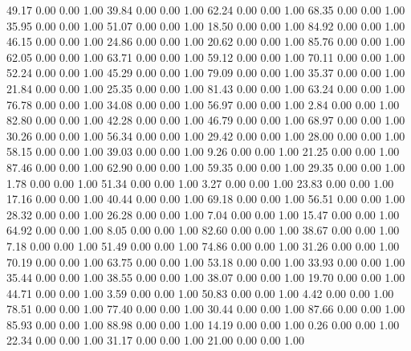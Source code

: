    49.17   0.00   0.00   1.00
   39.84   0.00   0.00   1.00
   62.24   0.00   0.00   1.00
   68.35   0.00   0.00   1.00
   35.95   0.00   0.00   1.00
   51.07   0.00   0.00   1.00
   18.50   0.00   0.00   1.00
   84.92   0.00   0.00   1.00
   46.15   0.00   0.00   1.00
   24.86   0.00   0.00   1.00
   20.62   0.00   0.00   1.00
   85.76   0.00   0.00   1.00
   62.05   0.00   0.00   1.00
   63.71   0.00   0.00   1.00
   59.12   0.00   0.00   1.00
   70.11   0.00   0.00   1.00
   52.24   0.00   0.00   1.00
   45.29   0.00   0.00   1.00
   79.09   0.00   0.00   1.00
   35.37   0.00   0.00   1.00
   21.84   0.00   0.00   1.00
   25.35   0.00   0.00   1.00
   81.43   0.00   0.00   1.00
   63.24   0.00   0.00   1.00
   76.78   0.00   0.00   1.00
   34.08   0.00   0.00   1.00
   56.97   0.00   0.00   1.00
    2.84   0.00   0.00   1.00
   82.80   0.00   0.00   1.00
   42.28   0.00   0.00   1.00
   46.79   0.00   0.00   1.00
   68.97   0.00   0.00   1.00
   30.26   0.00   0.00   1.00
   56.34   0.00   0.00   1.00
   29.42   0.00   0.00   1.00
   28.00   0.00   0.00   1.00
   58.15   0.00   0.00   1.00
   39.03   0.00   0.00   1.00
    9.26   0.00   0.00   1.00
   21.25   0.00   0.00   1.00
   87.46   0.00   0.00   1.00
   62.90   0.00   0.00   1.00
   59.35   0.00   0.00   1.00
   29.35   0.00   0.00   1.00
    1.78   0.00   0.00   1.00
   51.34   0.00   0.00   1.00
    3.27   0.00   0.00   1.00
   23.83   0.00   0.00   1.00
   17.16   0.00   0.00   1.00
   40.44   0.00   0.00   1.00
   69.18   0.00   0.00   1.00
   56.51   0.00   0.00   1.00
   28.32   0.00   0.00   1.00
   26.28   0.00   0.00   1.00
    7.04   0.00   0.00   1.00
   15.47   0.00   0.00   1.00
   64.92   0.00   0.00   1.00
    8.05   0.00   0.00   1.00
   82.60   0.00   0.00   1.00
   38.67   0.00   0.00   1.00
    7.18   0.00   0.00   1.00
   51.49   0.00   0.00   1.00
   74.86   0.00   0.00   1.00
   31.26   0.00   0.00   1.00
   70.19   0.00   0.00   1.00
   63.75   0.00   0.00   1.00
   53.18   0.00   0.00   1.00
   33.93   0.00   0.00   1.00
   35.44   0.00   0.00   1.00
   38.55   0.00   0.00   1.00
   38.07   0.00   0.00   1.00
   19.70   0.00   0.00   1.00
   44.71   0.00   0.00   1.00
    3.59   0.00   0.00   1.00
   50.83   0.00   0.00   1.00
    4.42   0.00   0.00   1.00
   78.51   0.00   0.00   1.00
   77.40   0.00   0.00   1.00
   30.44   0.00   0.00   1.00
   87.66   0.00   0.00   1.00
   85.93   0.00   0.00   1.00
   88.98   0.00   0.00   1.00
   14.19   0.00   0.00   1.00
    0.26   0.00   0.00   1.00
   22.34   0.00   0.00   1.00
   31.17   0.00   0.00   1.00
   21.00   0.00   0.00   1.00
